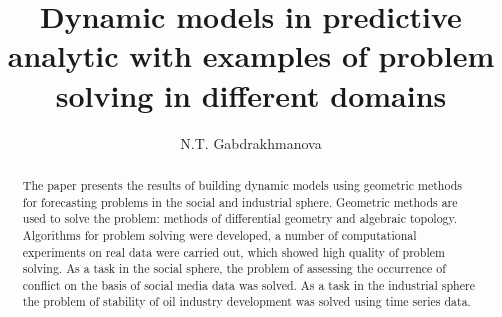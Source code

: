 \begin{englishtitle} %
\title{Dynamic models in predictive analytic with examples of problem solving in different domains}
\author{N.T. Gabdrakhmanova
}

\maketitle

\begin{abstract}
 The paper presents the results of building dynamic models using geometric methods for forecasting problems in the social and industrial sphere. Geometric methods are used to solve the problem: methods of differential geometry and algebraic topology. Algorithms for problem solving were developed, a number of computational experiments on real data were carried out, which showed high quality of problem solving. As a task in the social sphere, the problem of assessing the occurrence of conflict on the basis of social media data was solved. As a task in the industrial sphere the problem of stability of oil industry development was solved using time series data.

\end{abstract}
\end{englishtitle}


\iffalse
%
%


\documentclass[12pt]{llncs}


\usepackage{iftex}

\ifPDFTeX
\usepackage[T2A]{fontenc}
\usepackage[utf8]{inputenc} %
\usepackage[english,russian]{babel}
\fi

